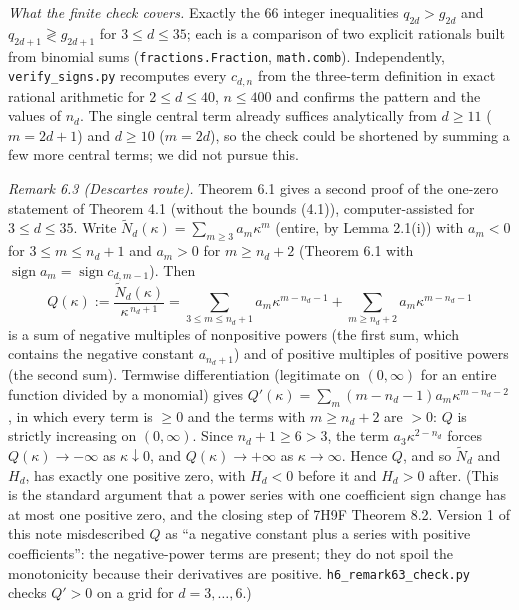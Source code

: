 \documentclass[
  11pt,
  a4paper,
]{article}
\begin{document}
\emph{What the finite check covers.} Exactly the \(66\) integer
inequalities \(q_{2d}>g_{2d}\) and \(q_{2d+1}\gtrless g_{2d+1}\) for
\(3\le d\le35\); each is a comparison of two explicit rationals built
from binomial sums ({\small\texttt{fractions.\allowbreak{}Fraction}}, {\small\texttt{math.\allowbreak{}comb}}).
Independently, {\small\texttt{verify\_\allowbreak{}signs.\allowbreak{}py}} recomputes every \(c_{d,\allowbreak{}n}\)
from the three-term definition in exact rational arithmetic for
\(2\le d\le40\), \(n\le400\) and confirms the pattern and the values of
\(n_d\). The single central term already suffices analytically from
\(d\ge11\) (\(m=2d+1\)) and \(d\ge10\) (\(m=2d\)), so the check could be
shortened by summing a few more central terms; we did not pursue this.

\emph{Remark 6.3 (Descartes route).} Theorem 6.1 gives a second proof of
the one-zero statement of Theorem 4.1 (without the bounds (4.1)),
computer-assisted for \(3\le d\le35\). Write
\(\tilde N_d(\kappa)=\sum_{m\ge3}a_m\kappa^m\) (entire, by Lemma 2.1(i))
with \(a_m<0\) for \(3\le m\le n_d+1\) and \(a_m>0\) for \(m\ge n_d+2\)
(Theorem 6.1 with
\(\operatorname{sign}a_m=\operatorname{sign}c_{d,\allowbreak{}m-1}\)). Then
\[Q(\kappa):=\frac{\tilde N_d(\kappa)}{\kappa^{\,n_d+1}}=\sum_{3\le m\le n_d+1}a_m\kappa^{m-n_d-1}+\sum_{m\ge n_d+2}a_m\kappa^{m-n_d-1}\]
is a sum of negative multiples of nonpositive powers (the first sum,
which contains the negative constant \(a_{n_d+1}\)) and of positive
multiples of positive powers (the second sum). Termwise differentiation
(legitimate on \((0,\allowbreak{}\infty)\) for an entire function divided by a
monomial) gives \(Q'(\kappa)=\sum_m(m-n_d-1)a_m\kappa^{m-n_d-2}\), in
which every term is \(\ge0\) and the terms with \(m\ge n_d+2\) are
\(>0\): \(Q\) is strictly increasing on \((0,\allowbreak{}\infty)\). Since
\(n_d+1\ge6>3\), the term \(a_3\kappa^{2-n_d}\) forces
\(Q(\kappa)\to-\infty\) as \(\kappa\downarrow0\), and
\(Q(\kappa)\to+\infty\) as \(\kappa\to\infty\). Hence \(Q\), and so
\(\tilde N_d\) and \(H_d\), has exactly one positive zero, with
\(H_d<0\) before it and \(H_d>0\) after. (This is the standard argument
that a power series with one coefficient sign change has at most one
positive zero, and the closing step of 7H9F Theorem 8.2. Version 1 of
this note misdescribed \(Q\) as ``a negative constant plus a series with
positive coefficients'': the negative-power terms are present; they do
not spoil the monotonicity because their derivatives are positive.
{\small\texttt{h6\_\allowbreak{}remark63\_\allowbreak{}check.\allowbreak{}py}} checks \(Q'>0\) on a grid for
\(d=3,\allowbreak{}\dots,\allowbreak{}6\).)
\end{document}

